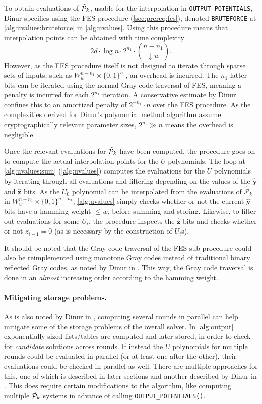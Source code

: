 To obtain evaluations of $\Tilde{\mathcal{P}}_k$, usable for the interpolation in \texttt{OUTPUT\_POTENTIALS}, Dinur specifies using the FES procedure (\cref{sec:prereq:fes}), denoted \texttt{BRUTEFORCE} at \cref{alg:uvalues:bruteforce} in \cref{alg:uvalues}. Using this procedure means that interpolation points can be obtained with time complexity 
$$
    2d \cdot \log n \cdot 2^{n_1} \cdot \binom{n - n_1}{\downarrow w}.
$$
However, as the FES procedure itself is not designed to iterate through sparse sets of inputs, such as $W^{n - n_1}_w \times \{0, 1\}^{n_1}$, an overhead is incurred. The $n_1$ latter bits can be iterated using the normal Gray code traversal of FES, meaning a penalty is incurred for each $2^{n_1}$ iteration. A conservative estimate by Dinur confines this to an amortized penalty of $2^{- n_1} \cdot n$ over the FES procedure. As the complexities derived for Dinur's polynomial method algorithm assume cryptographically relevant parameter sizes, $2^{n_1} \gg n$ means the overhead is negligible.

Once the relevant evaluations for $\Tilde{\mathcal{P}}_k$ have been computed, the procedure goes on to compute the actual interpolation points for the $U$ polynomials. The loop at \cref{alg:uvalues:sum} (\cref{alg:uvalues}) computes the evaluations for the $U$ polynomials by iterating through all evaluations and filtering depending on the values of the $\hat{\mathbf{y}}$ and $\hat{\mathbf{z}}$ bits. As the $U_0$ polynomial can be interpolated from the evaluations of $\hat{\mathcal{P}}_k$ in $W^{n - n_1}_w \times \{0, 1\}^{n - n_1}$, \cref{alg:uvalues} simply checks whether or not the current $\hat{\mathbf{y}}$ bits have a hamming weight $\leq w$, before summing and storing. Likewise, to filter out evaluations for some $U_i$, the procedure inspects the $\hat{\mathbf{z}}$-bits and checks whether or not $z_{i - 1} = 0$ (as is necessary by the construction of $U_i$s).

It should be noted that the Gray code traversal of the FES sub-procedure could also be reimplemented using monotone Gray codes instead of traditional binary reflected Gray codes, as noted by Dinur in \cite{eurocrypt-2021-30841}. This way, the Gray code traversal is done in an \textit{almost} increasing order according to the hamming weight.

\paragraph{Mitigating storage problems.} As is also noted by Dinur in \cite{eurocrypt-2021-30841}, computing several rounds in parallel can help mitigate some of the storage problems of the overall solver. In \cref{alg:output} exponentially sized lists/tables are computed and later stored, in order to check for \textit{candidate} solutions across rounds. If instead the $U$ polynomials for multiple rounds could be evaluated in parallel (or at least one after the other), their evaluations could be checked in parallel as well. There are multiple approaches for this, one of which is described in later sections and another described by Dinur in \cite{eurocrypt-2021-30841}. This does require certain modifications to the algorithm, like computing multiple $\Tilde{\mathcal{P}}_k$ systems in advance of calling \texttt{OUTPUT\_POTENTIALS()}. 